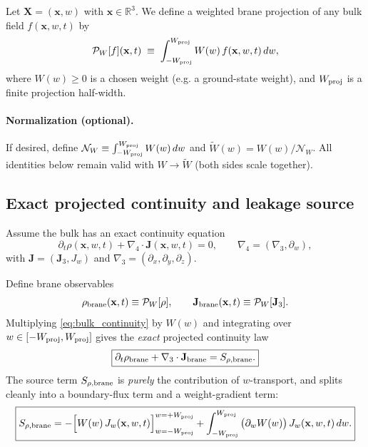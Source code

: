 \documentclass[11pt]{article}
\begin{document}
Let $\mathbf{X}=(\mathbf{x},w)$ with $\mathbf{x}\in\mathbb{R}^3$.
We define a weighted brane projection of any bulk field $f(\mathbf{x},w,t)$ by
\begin{equation}
\mathcal{P}_W[f](\mathbf{x},t)
\;\equiv\;
\int_{-W_{\rm proj}}^{W_{\rm proj}} W(w)\, f(\mathbf{x},w,t)\,dw,
\label{eq:app_PW_def}
\end{equation}
where $W(w)\ge 0$ is a chosen weight (e.g. a ground-state weight), and
$W_{\rm proj}$ is a finite projection half-width.

\paragraph{Normalization (optional).}
If desired, define $\mathcal{N}_W\equiv \int_{-W_{\rm proj}}^{W_{\rm proj}}W(w)\,dw$ and
$\widetilde W(w)=W(w)/\mathcal{N}_W$.
All identities below remain valid with $W\to \widetilde W$ (both sides scale together).

\subsection{Exact projected continuity and leakage source}
\label{app:projected_continuity}

Assume the bulk has an exact continuity equation
\begin{equation}
\partial_t\rho(\mathbf{x},w,t) + \nabla_4\cdot \mathbf{J}(\mathbf{x},w,t)=0,
\qquad
\nabla_4=(\nabla_3,\partial_w),
\label{eq:bulk_continuity}
\end{equation}
with $\mathbf{J}=(\mathbf{J}_3,J_w)$ and $\nabla_3=(\partial_x,\partial_y,\partial_z)$.

Define brane observables
\begin{equation}
\rho_{\rm brane}(\mathbf{x},t)\equiv \mathcal{P}_W[\rho],
\qquad
\mathbf{J}_{\rm brane}(\mathbf{x},t)\equiv \mathcal{P}_W[\mathbf{J}_3].
\label{eq:brane_rho_J_def}
\end{equation}
Multiplying \eqref{eq:bulk_continuity} by $W(w)$ and integrating over
$w\in[-W_{\rm proj},W_{\rm proj}]$ gives the \emph{exact} projected continuity law
\begin{equation}
\boxed{
\partial_t\rho_{\rm brane} + \nabla_3\cdot \mathbf{J}_{\rm brane}
=
S_{\rho,{\rm brane}}.
}
\label{eq:proj_cont_exact}
\end{equation}
The source term $S_{\rho,{\rm brane}}$ is \emph{purely} the contribution of $w$-transport,
and splits cleanly into a boundary-flux term and a weight-gradient term:
\begin{align}
\boxed{
S_{\rho,{\rm brane}}
=
-\Big[ W(w)\,J_w(\mathbf{x},w,t)\Big]_{w=-W_{\rm proj}}^{w=+W_{\rm proj}}
+
\int_{-W_{\rm proj}}^{W_{\rm proj}} \big(\partial_w W(w)\big)\,J_w(\mathbf{x},w,t)\,dw.
}
\label{eq:Srho_exact}
\end{align}
\end{document}
